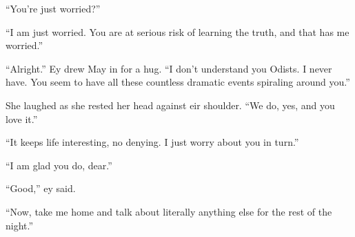 ``You're just worried?''

``I am just worried. You are at serious risk of learning the truth, and that has me worried.''

``Alright.'' Ey drew May in for a hug. ``I don't understand you Odists. I never have. You seem to have all these countless dramatic events spiraling around you.''

She laughed as she rested her head against eir shoulder. ``We do, yes, and you love it.''

``It keeps life interesting, no denying. I just worry about you in turn.''

``I am glad you do, dear.''

``Good,'' ey said.

``Now, take me home and talk about literally anything else for the rest of the night.''
